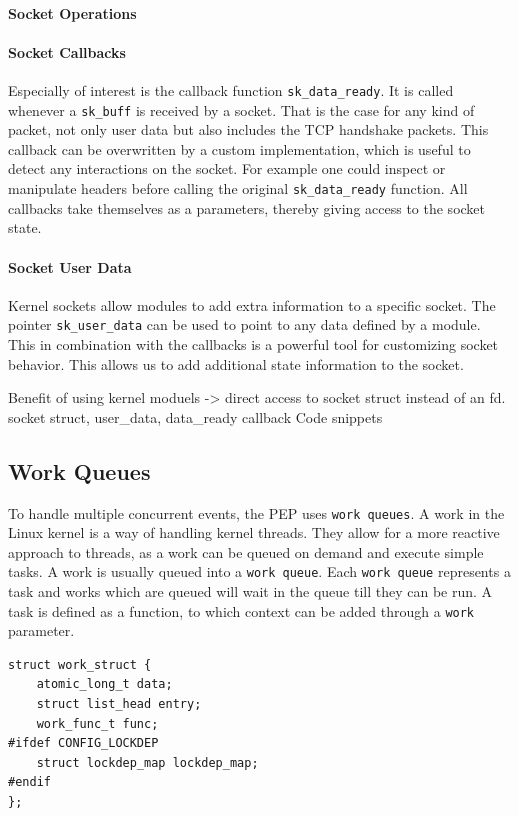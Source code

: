 \documentclass[a4paper,english, 11pt]{report}
\begin{document}
\paragraph{Socket Operations}

\paragraph{Socket Callbacks}
Especially of interest is the callback function \verb|sk_data_ready|. It is called whenever a \verb|sk_buff| is received by a socket. That is the case for any kind of packet, not only user data but also includes the TCP handshake packets. This callback can be overwritten by a custom implementation, which is useful to detect any interactions on the socket. For example one could inspect or manipulate headers before calling the original \verb|sk_data_ready| function. All callbacks take themselves as a parameters, thereby giving access to the socket state. \\

\paragraph{Socket User Data}
Kernel sockets allow modules to add extra information to a specific socket. The pointer \verb|sk_user_data| can be used to point to any data defined by a module. This in combination with the callbacks is a powerful tool for customizing socket behavior. This allows us to add additional state information to the socket.

Benefit of using kernel moduels -> direct access to socket struct instead of an fd.
socket struct, user\_data, data\_ready callback
Code snippets

\subsection{Work Queues}
To handle multiple concurrent events, the PEP uses \verb|work queues|. A work in the Linux kernel is a way of handling kernel threads. They allow for a more reactive approach to threads, as a work can be queued on demand and execute simple tasks. A work is usually queued into a \verb|work queue|. Each \verb|work queue| represents a task and works which are queued will wait in the queue till they can be run. A task is defined as a function, to which context can be added through a \verb|work| parameter.\\

\noindent\begin{minipage}{\linewidth}
\begin{verbatim}
struct work_struct {
    atomic_long_t data;
    struct list_head entry;
    work_func_t func;
#ifdef CONFIG_LOCKDEP
    struct lockdep_map lockdep_map;
#endif
};
\end{verbatim}
\label{fig:work_struct}
\end{minipage}
\end{document}
